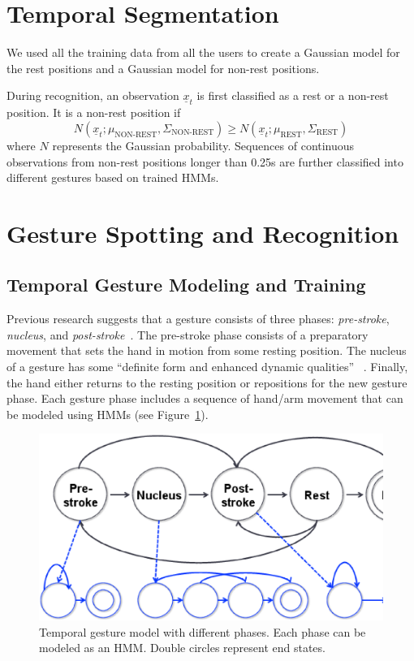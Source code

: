 \documentclass{acm_proc_article-sp}
\begin{document}
\section{Temporal Segmentation}\label{sec:recognition}
We used all the training data from all the users to create a Gaussian model for the rest 
positions and a Gaussian model for non-rest positions.

During recognition, an observation $\underline{x}_t$ is first classified as a 
rest or a non-rest position. It is a non-rest position if 
\begin{displaymath}
N(\underline{x}_t; \mu_{\text{NON-REST}}, \Sigma_{\text{NON-REST}}) \geq N(\underline{x}_t; \mu_{\text{REST}}, \Sigma_{\text{REST}})
\end{displaymath}
where $N$ represents the Gaussian probability. Sequences of continuous observations from non-rest
positions longer than 0.25s are further classified into different gestures based on trained HMMs.
 
\section{Gesture Spotting and Recognition}
\subsection{Temporal Gesture Modeling and Training}
Previous research suggests that
a gesture consists of three phases: \textit{pre-stroke}, \textit{nucleus}, and \textit{post-stroke}~\cite{Pavlovic97}. The pre-stroke phase consists
of a preparatory movement that sets the hand in motion from some resting position.
The nucleus of a gesture has some ``definite form and enhanced dynamic qualities''
~\cite{kendon86}. Finally, the hand either returns to the resting position or repositions
for the new gesture phase. Each gesture
phase includes a sequence of hand/arm movement that can be modeled using HMMs (see Figure~\ref{fig:hmm}). 

\begin{figure}[tb]
\centering
\includegraphics[clip, width=1\columnwidth]{fig/hmm.ps}
\caption{Temporal gesture model with different phases. Each phase can be modeled as an HMM. Double circles
represent end states.}
\label{fig:hmm}
\end{figure}
\end{document}
